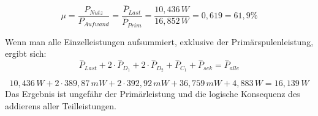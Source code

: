         \begin{equation}
            \mu=\frac{P_{Nutz}}{P_{Aufwand}}= \frac{\overset{-}{P}_{Last}}{\overset{-}{P}_{Prim}}= \frac{10,436\, W}{16,852\, W}= 0,619 = 61,9\%
        \end{equation}

        Wenn man alle Einzelleistungen aufsummiert, exklusive der Primärspulenleistung, ergibt sich: 
        \begin{equation}
            \overset{-}{P}_{Last}+2\cdot\overset{-}{P}_{D_1}+2\cdot\overset{-}{P}_{D_2}+\overset{-}{P}_{C_1}+\overset{-}{P}_{sek}= \overset{-}{P}_{alle}
        \end{equation}

        \begin{equation}
            10,436\, W+2\cdot 389,87\, mW+2\cdot 392,92\, mW + 36,759\, mW + 4,883\, W = 16,139\, W 
        \end{equation}
        Das Ergebnis ist ungefähr der Primärleistung und die logische Konsequenz des addierens aller Teilleistungen.


